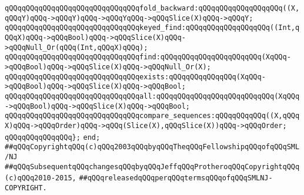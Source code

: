 \verb|qQQqqQQqqQQqqQQqqQQqqQQqqQQqqQQqfold_backward:qQQqqQQqqQQqqQQqqQQq((X,qQQqY)qQQq->qQQqY)qQQq->qQQqYqQQq->qQQqSlice(X)qQQq->qQQqY;|\newline
\newline
\verb|qQQqqQQqqQQqqQQqqQQqqQQqqQQqqQQqkeyed_find:qQQqqQQqqQQqqQQqqQQq((Int,qQQqX)qQQq->qQQqBool)qQQq->qQQqSlice(X)qQQq->qQQqNull_Or(qQQq(Int,qQQqX)qQQq);|\newline
\verb|qQQqqQQqqQQqqQQqqQQqqQQqqQQqqQQqfind:qQQqqQQqqQQqqQQqqQQqqQQq(XqQQq->qQQqBool)qQQq->qQQqSlice(X)qQQq->qQQqNull_Or(X);|\newline
\verb|qQQqqQQqqQQqqQQqqQQqqQQqqQQqqQQqexists:qQQqqQQqqQQqqQQq(XqQQq->qQQqBool)qQQq->qQQqSlice(X)qQQq->qQQqBool;|\newline
\verb|qQQqqQQqqQQqqQQqqQQqqQQqqQQqqQQqall:qQQqqQQqqQQqqQQqqQQqqQQqqQQq(XqQQq->qQQqBool)qQQq->qQQqSlice(X)qQQq->qQQqBool;|\newline
\verb|qQQqqQQqqQQqqQQqqQQqqQQqqQQqqQQqcompare_sequences:qQQqqQQqqQQq((X,qQQqX)qQQq->qQQqOrder)qQQq->qQQq(Slice(X),qQQqSlice(X))qQQq->qQQqOrder;|\newline
\verb|qQQqqQQqqQQqqQQq};|\newline
\verb|end;|\newline
\newline
\verb|##qQQqCopyrightqQQq(c)qQQq2003qQQqbyqQQqTheqQQqFellowshipqQQqofqQQqSML/NJ|\newline
\verb|##qQQqSubsequentqQQqchangesqQQqbyqQQqJeffqQQqProtheroqQQqCopyrightqQQq(c)qQQq2010-2015,|\newline
\verb|##qQQqreleasedqQQqperqQQqtermsqQQqofqQQqSMLNJ-COPYRIGHT.|\newline

